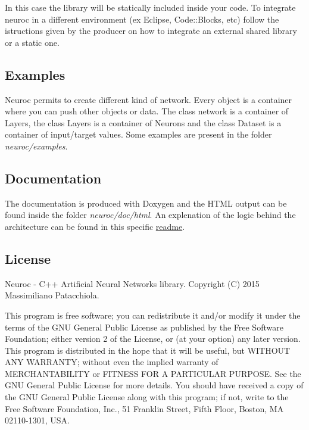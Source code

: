 In this case the library will be statically included inside your code. To integrate neuroc in a different environment (ex Eclipse, Code\-::\-Blocks, etc) follow the istructions given by the producer on how to integrate an external shared library or a static one.

\subsection*{Examples }

Neuroc permits to create different kind of network. Every object is a container where you can push other objects or data. The class network is a container of Layers, the class Layers is a container of Neurons and the class Dataset is a container of input/target values. Some examples are present in the folder {\itshape neuroc/examples}.

\subsection*{Documentation }

The documentation is produced with Doxygen and the H\-T\-M\-L output can be found inside the folder {\itshape neuroc/doc/html}. An explenation of the logic behind the architecture can be found in this specific \hyperlink{md__a_r_c_h_i_t_e_c_t_u_r_e}{readme}.

\subsection*{License }

Neuroc -\/ C++ Artificial Neural Networks library. Copyright (C) 2015 Massimiliano Patacchiola.

This program is free software; you can redistribute it and/or modify it under the terms of the G\-N\-U General Public License as published by the Free Software Foundation; either version 2 of the License, or (at your option) any later version. This program is distributed in the hope that it will be useful, but W\-I\-T\-H\-O\-U\-T A\-N\-Y W\-A\-R\-R\-A\-N\-T\-Y; without even the implied warranty of M\-E\-R\-C\-H\-A\-N\-T\-A\-B\-I\-L\-I\-T\-Y or F\-I\-T\-N\-E\-S\-S F\-O\-R A P\-A\-R\-T\-I\-C\-U\-L\-A\-R P\-U\-R\-P\-O\-S\-E. See the G\-N\-U General Public License for more details. You should have received a copy of the G\-N\-U General Public License along with this program; if not, write to the Free Software Foundation, Inc., 51 Franklin Street, Fifth Floor, Boston, M\-A 02110-\/1301, U\-S\-A. 